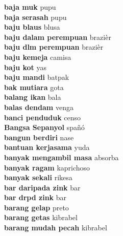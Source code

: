 \textbf{ baja muk  } pupu \\
\textbf{ baja serasah  } pupu \\
\textbf{ baju blaus  } blusa \\
\textbf{ baju dalam perempuan  } brazièr \\
\textbf{ baju dlm perempuan  } brazièr \\
\textbf{ baju kemeja  } camisa \\
\textbf{ baju kot  } yas \\
\textbf{ baju mandi  } batpak \\
\textbf{ bak mutiara  } gota \\
\textbf{ balang ikan  } bala \\
\textbf{ balas dendam  } venga \\
\textbf{ banci penduduk  } censo \\
\textbf{ Bangsa Sepanyol  } spañó \\
\textbf{ bangun berdiri  } nase \\
\textbf{ bantuan kerjasama  } yuda \\
\textbf{ banyak mengambil masa  } absorba \\
\textbf{ banyak ragam  } kaprichoso \\
\textbf{ banyak sekali  } rikesa \\
\textbf{ bar daripada zink  } bar \\
\textbf{ bar drpd zink  } bar \\
\textbf{ barang gelap  } preto \\
\textbf{ barang getas  } kibrabel \\
\textbf{ barang mudah pecah  } kibrabel \\
